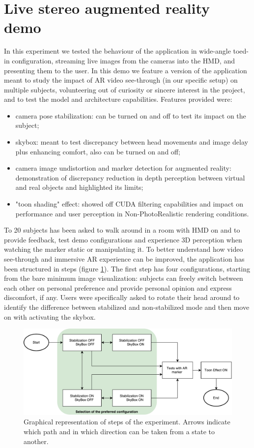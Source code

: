 \section{Live stereo augmented reality demo}
In this experiment we tested the behaviour of the application in wide-angle toed-in configuration, streaming live images from the cameras into the HMD, and presenting them to the user. In this demo we feature a version of the application meant to study the impact of AR video see-through (in our specific setup) on multiple subjects, volunteering out of curiosity or sincere interest in the project, and to test the model and architecture capabilities. Features provided were:
\begin{itemize}
\item camera pose stabilization: can be turned on and off to test its impact on the subject;
\item skybox: meant to test discrepancy between head movements and image delay plus enhancing comfort, also can be turned on and off;
\item camera image undistortion and marker detection for augmented reality: demonstration of discrepancy reduction in depth perception between virtual and real objects and highlighted its limits;
\item "toon shading" effect: showed off CUDA filtering capabilities and impact on performance and user perception in Non-PhotoRealistic rendering conditions.
\end{itemize}

To 20 subjects has been asked to walk around in a room with HMD on and to provide feedback, test demo configurations and experience 3D perception when watching the marker static or manipulating it. To better understand how video see-through and immersive AR experience can be improved, the application has been structured in steps (figure \ref{fig:demo_steps}). The first step has four configurations, starting from the bare minimum image visualization: subjects can freely switch between each other on personal preference and provide personal opinion and express discomfort, if any. Users were specifically asked to rotate their head around to identify the difference between stabilized and non-stabilized mode and then move on with activating the skybox.

\begin{figure}
\centering
\includegraphics[width=\linewidth]{schemas/demosteps}
\caption{Graphical representation of steps of the experiment. Arrows indicate which path and in which direction can be taken from a state to another.}
\label{fig:demo_steps}
\end{figure}

